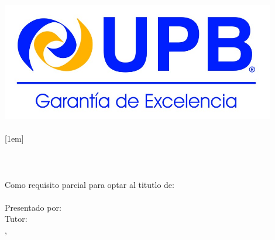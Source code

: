 
\begin{titlepage}
    \begin{center}
		\vspace{1.5cm}
		\includegraphics[width=12cm]{img/UPB.png}\\
		[1.5em]
		{\fontsize{16}{6}\selectfont{\textbf{\MakeUppercase{\university}}}}\\
		[1em]
		{\fontsize{16}{6}\selectfont{\textbf{\MakeUppercase{\faculty}}}}\\
		[1em]
		{\fontsize{16}{6}\selectfont{\textbf{\MakeUppercase{\carrer}}}}\\
		[2.2cm]
		{\fontsize{16}{6}\selectfont{\textbf{\MakeUppercase{\projectName}}}}\\
		[2.6cm]
		{\fontsize{16}{6}\selectfont{\MakeUppercase{\titulationMode}}}\\
		[2.2cm]
		\large{Como requisito parcial para optar al titutlo de:}\\
		[0.5em]
		\large{\textbf{\MakeUppercase{\degreeTitle}}}\\
		[0.5em]
		\large{Presentado por: \authorName}\\
		[0.5em]
		\large{Tutor: \tutorName}\\
		[2.2cm]
		\large{\mycity, \mydate}
    \end{center}
\end{titlepage}
